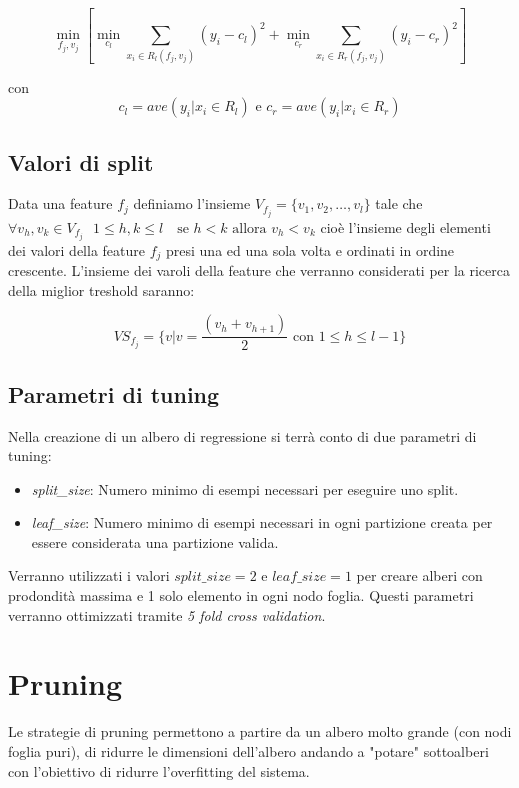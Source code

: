 \documentclass{article}
\begin{document}
    \[
        \min_{f_j, v_j} \left[ 
        \min_{c_l} 
        \sum_{x_i \in R_l(f_j, v_j)} (y_i - c_l)^2 + 
        \min_{c_r} 
        \sum_{x_i \in R_r(f_j, v_j)} (y_i - c_r)^2
        \right]
    \]

    con
     \[
         c_l = ave(y_i| x_i \in R_l) \text{ e  }  c_r = ave(y_i| x_i \in R_r)
     \]

     \subsection{Valori di split}
     Data una feature $f_j$ definiamo l'insieme $V_{f_j}=\{v_1,v_2,\ldots,v_l\}$ 
     tale che $\forall v_h,v_k \in V_{f_j}  \text{ }1 \leq h,k \leq l \text{ }
     \text{ se } h < k \text{ allora } v_h < v_k$ cioè l'insieme degli elementi dei
     valori della feature $f_j$ presi una ed una sola volta e ordinati in ordine crescente.
     L'insieme dei varoli della feature che verranno considerati per la ricerca 
     della miglior treshold saranno:
        
        \[
          VS_{f_j} = \{v | v=\frac{(v_h + v_{h+1})}{2} \text{ con } 1 \leq h \leq l-1\}  
        \]
        
        
    \subsection{Parametri di tuning}
    Nella creazione di un albero di regressione si terrà conto 
    di due parametri di tuning:
    \begin{itemize}
        \item \textit{split\_size}: Numero minimo di esempi
        necessari per eseguire uno split.
        \item \textit{leaf\_size}: Numero minimo di esempi
        necessari in ogni partizione creata per essere considerata 
        una partizione valida.
    \end{itemize}

    Verranno utilizzati i valori $\textit{split\_size}=2$ e $\textit{leaf\_size}=1$
    per creare alberi con prodondità massima e 1 solo elemento in ogni nodo foglia.
    Questi parametri verranno ottimizzati tramite \textit{5 fold cross validation}.


    \newpage

  \section{Pruning}
  Le strategie di pruning permettono a partire da un albero 
  molto grande (con nodi foglia puri), di ridurre le dimensioni dell'albero andando
  a "potare" sottoalberi con l'obiettivo di ridurre l'overfitting
  del sistema.
\end{document}
